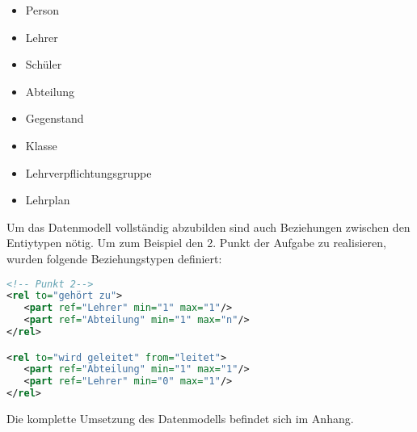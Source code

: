 \begin{multicols}{2}
	\begin{itemize}
		\item Person
		\item Lehrer
		\item Schüler
		\item Abteilung
		\item Gegenstand
		\item Klasse
		\item Lehrverpflichtungsgruppe
		\item Lehrplan
	\end{itemize}
\end{multicols}

\noindent
Um das Datenmodell vollständig abzubilden sind auch Beziehungen zwischen den Entiytypen nötig. Um zum Beispiel den 2. Punkt der Aufgabe zu realisieren, wurden folgende Beziehungstypen definiert:

\begin{lstlisting}[language=XML, caption={XERML-Definition von Punkt 2 der Angabe}]
<!-- Punkt 2-->
<rel to="gehört zu">
   <part ref="Lehrer" min="1" max="1"/>
   <part ref="Abteilung" min="1" max="n"/>
</rel>

<rel to="wird geleitet" from="leitet">
   <part ref="Abteilung" min="1" max="1"/>
   <part ref="Lehrer" min="0" max="1"/>
</rel>
\end{lstlisting}

\noindent
Die komplette Umsetzung des Datenmodells befindet sich im Anhang.